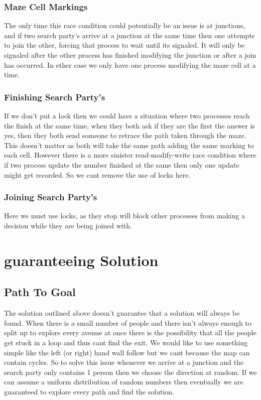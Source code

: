 \documentclass[a4paper, 12pt]{article}
\begin{document}
			\subsubsection{Maze Cell Markings}
  				The only time this race condition could potentially be an issue is at junctions, and if two search party's arrive at a junction at the same time then one attempts to join the other, forcing that process to wait until its signaled. It will only be signaled after the other process has finished modifying the junction or after a join has occurred. In ether case we only have one process modifying the maze cell at a time.
  	
			\subsubsection{Finishing Search Party's}
				If we don't put a lock then we could have a situation where two processes reach the finish at the same time, when they both ask if they are the first the answer is yes, then they both send someone to retrace the path taken through the maze. This doesn't matter as both will take the same path adding the same marking to each cell. However there is a more sinister read-modify-write race condition where if two process update the number finished at the same then only one update might get recorded. So we cant remove the use of locks here.

			
			\subsubsection{Joining Search Party's}
				Here we must use locks, as they stop will block other processes from making a decision while they are being joined with.
				
		
  	
	\section{guaranteeing Solution}
		\subsection{Path To Goal}
			The solution outlined above doesn't guarantee that a solution will always be found. When there is a small number of people and there isn't always enough to split up to explore every avenue at once there is the possibility that all the people get stuck in a loop and thus cant find the exit. We would like to use something simple like the left (or right) hand wall follow but we cant because the map can contain cycles. So to solve this issue whenever we arrive at a junction and the search party only contains 1 person then we choose the direction at random. If we can assume a uniform distribution of random numbers then eventually we are guaranteed to explore every path and find the solution.	
			
\end{document}
